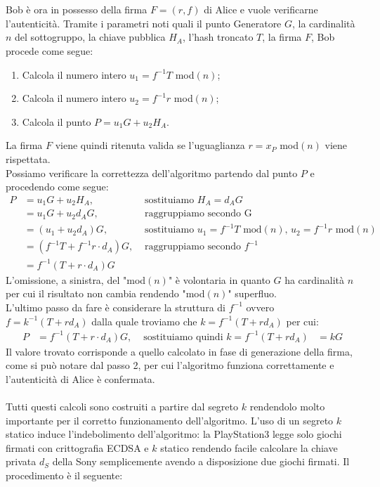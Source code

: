 \documentclass[a4paper,12pt]{tesiinfo}
\begin{document}
\\
\\
Bob \`e ora in possesso della firma $F = (r, f)$ di Alice e vuole verificarne l'autenticit\`a. Tramite i parametri noti quali il punto Generatore $G$, la cardinalit\`a $n$ del sottogruppo, la chiave pubblica $H_A$, l'hash troncato $T$, la firma $F$, Bob procede come segue:
\begin{enumerate}
    \item Calcola il numero intero $u_1 = f^{-1}T$ mod$(n)$;
    \item Calcola il numero intero $u_2 = f^{-1}r$ mod$(n)$;
    \item Calcola il punto $P = u_1G + u_2H_A$.
\end{enumerate}
La firma $F$ viene quindi ritenuta valida se l'uguaglianza $r = x_P $ mod$(n)$ viene rispettata.
\\
Possiamo verificare la correttezza dell'algoritmo partendo dal punto $P$ e procedendo come segue:
\begin{align*}
    P &= u_1G + u_2H_A, &\text{ sostituiamo } H_A = d_AG\\
    &= u_1G + u_2d_AG, &\text{ raggruppiamo secondo G }\\
    &= (u_1 + u_2d_A)G, &\text{ sostituiamo } u_1 = f^{-1}T \text{ mod$(n)$, } u_2 = f^{-1}r\text{ mod$(n)$}\\
    &= (f^{-1}T + f^{-1}r \cdot d_A)G, &\text{ raggruppiamo secondo } f^{-1}\\
    &= f^{-1}(T + r \cdot d_A)G
\end{align*}
L'omissione, a sinistra, del "mod$(n)$" \`e volontaria in quanto $G$ ha cardinalit\`a $n$ per cui il risultato non cambia rendendo "mod$(n)$" superfluo.
\\
L'ultimo passo da fare \`e considerare la struttura di $f^{-1}$ ovvero $f = k^{-1} (T+rd_A)$ dalla quale troviamo che $k = f^{-1} (T+rd_A)$ per cui:
\begin{align*}
    P &= f^{-1}(T + r \cdot d_A)G, &\text{ sostituiamo quindi } k = f^{-1} (T+rd_A)
    &= kG
\end{align*}
Il valore trovato corrisponde a quello calcolato in fase di generazione della firma, come si pu\`o notare dal passo 2, per cui l'algoritmo funziona correttamente e l'autenticit\`a di Alice \`e confermata.
\\
\\
Tutti questi calcoli sono costruiti a partire dal segreto $k$ rendendolo molto importante per il corretto funzionamento dell'algoritmo. L'uso di un segreto $k$ statico induce l'indebolimento dell'algoritmo: la PlayStation3 legge solo giochi firmati con crittografia ECDSA e $k$ statico rendendo facile calcolare la chiave privata $d_S$ della Sony semplicemente avendo a disposizione due giochi firmati. Il procedimento \`e il seguente:
\end{document}
